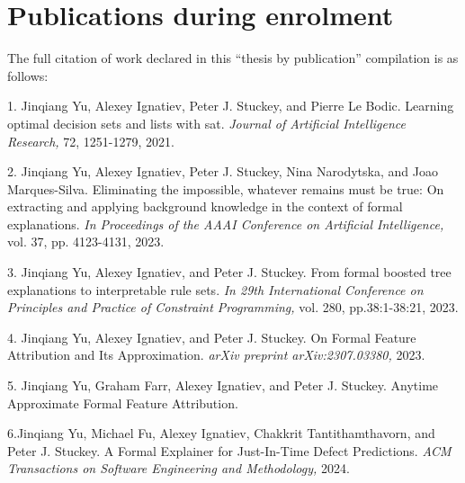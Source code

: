 

\section*{Publications during enrolment}

The full citation of work declared in this ``thesis by publication'' compilation is as follows:

{\large

1. Jinqiang Yu, Alexey Ignatiev, Peter J. Stuckey, and Pierre Le Bodic. Learning optimal decision
sets and lists with sat. \emph{Journal of Artificial Intelligence Research,} 72, 1251-1279, 2021.

2. Jinqiang Yu, Alexey Ignatiev, Peter J. Stuckey, Nina Narodytska, and Joao Marques-Silva.
Eliminating the impossible, whatever remains must be true: On extracting and applying background
knowledge in the context of formal explanations. \emph{In Proceedings of the AAAI Conference on Artificial
Intelligence,} vol. 37, pp. 4123-4131, 2023.

3. Jinqiang Yu, Alexey Ignatiev, and Peter J. Stuckey. From formal boosted tree explanations to
interpretable rule sets. \emph{In 29th International Conference on Principles and Practice of
	Constraint Programming,} vol. 280, pp.38:1-38:21, 2023.

4. Jinqiang Yu, Alexey Ignatiev, and Peter J. Stuckey. On Formal Feature Attribution and Its
Approximation. \emph{arXiv preprint arXiv:2307.03380,} 2023.

5. Jinqiang Yu, Graham Farr, Alexey Ignatiev, and Peter J. Stuckey. Anytime Approximate Formal
Feature Attribution. 

6.Jinqiang Yu, Michael Fu, Alexey Ignatiev, Chakkrit Tantithamthavorn, and Peter J. Stuckey. A
Formal Explainer for Just-In-Time Defect Predictions. \emph{ACM Transactions on Software Engineering
	and Methodology,} 2024. 
}
